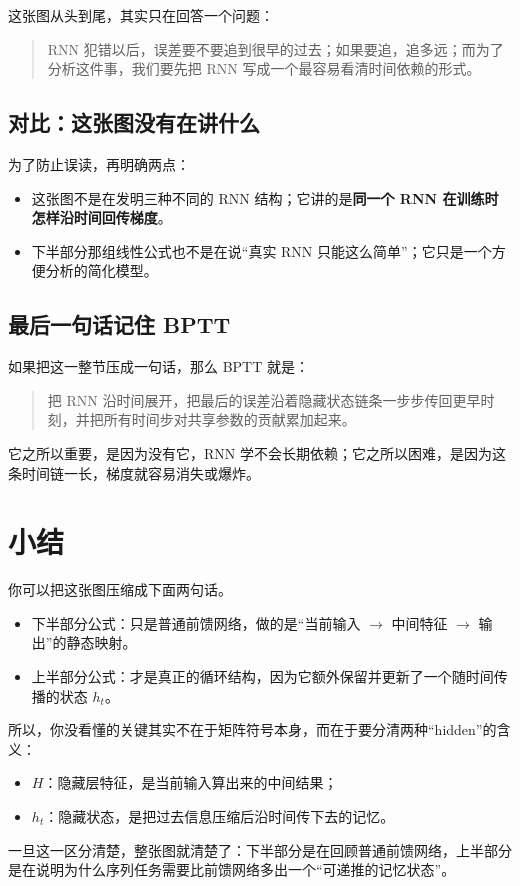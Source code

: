\documentclass[12pt,a4paper]{ctexart}
\begin{document}
这张图从头到尾，其实只在回答一个问题：
\begin{quote}
RNN 犯错以后，误差要不要追到很早的过去；如果要追，追多远；而为了分析这件事，我们要先把 RNN 写成一个最容易看清时间依赖的形式。
\end{quote}

\subsection{对比：这张图没有在讲什么}

为了防止误读，再明确两点：
\begin{itemize}
  \item 这张图不是在发明三种不同的 RNN 结构；它讲的是\textbf{同一个 RNN 在训练时怎样沿时间回传梯度}。
  \item 下半部分那组线性公式也不是在说“真实 RNN 只能这么简单”；它只是一个方便分析的简化模型。
\end{itemize}

\subsection{最后一句话记住 BPTT}

如果把这一整节压成一句话，那么 BPTT 就是：
\begin{quote}
把 RNN 沿时间展开，把最后的误差沿着隐藏状态链条一步步传回更早时刻，并把所有时间步对共享参数的贡献累加起来。
\end{quote}

它之所以重要，是因为没有它，RNN 学不会长期依赖；它之所以困难，是因为这条时间链一长，梯度就容易消失或爆炸。

\section{小结}

你可以把这张图压缩成下面两句话。

\begin{itemize}
  \item 下半部分公式：只是普通前馈网络，做的是“当前输入 $\rightarrow$ 中间特征 $\rightarrow$ 输出”的静态映射。
  \item 上半部分公式：才是真正的循环结构，因为它额外保留并更新了一个随时间传播的状态 \(h_t\)。
\end{itemize}

所以，你没看懂的关键其实不在于矩阵符号本身，而在于要分清两种“hidden”的含义：
\begin{itemize}
  \item \(H\)：隐藏层特征，是当前输入算出来的中间结果；
  \item \(h_t\)：隐藏状态，是把过去信息压缩后沿时间传下去的记忆。
\end{itemize}

一旦这一区分清楚，整张图就清楚了：下半部分是在回顾普通前馈网络，上半部分是在说明为什么序列任务需要比前馈网络多出一个“可递推的记忆状态”。
\end{document}
